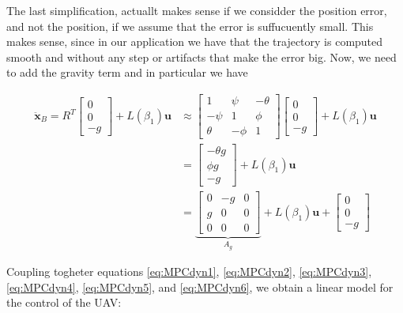\noindent The last simplification, actuallt makes sense if we considder the position error, and not the position, if we assume that the error is suffucuently small. This makes sense, since in our application we have that the trajectory is computed smooth and without any step or artifacts that make the error big. Now, we need to add the gravity term and in particular we have

\begin{align}
	\ddot{\mathbf{x}}_B = R^T
	\begin{bmatrix}
		0 \\
		0 \\
		-g
	\end{bmatrix}
	+L(\beta_1)\mathbf{u} &\approx
	\begin{bmatrix}
		1 & \psi  & -\theta \\
		-\psi & 1 & \phi \\
		\theta & -\phi & 1  
	\end{bmatrix}
	\begin{bmatrix}
		0 \\
		0 \\
		-g
	\end{bmatrix}	
	+L(\beta_1)\mathbf{u} \nonumber \\
	&=
	\begin{bmatrix}
		-\theta g \\
		\phi g \\
		-g 
	\end{bmatrix}
	+L(\beta_1)\mathbf{u} \nonumber \\
	&=\underbrace{ 
	\begin{bmatrix}
		0 & -g & 0 \\
		g & 0  & 0 \\
		0 & 0  & 0
	\end{bmatrix}}_{A_g} + L(\beta_1)\mathbf{u}+
	\begin{bmatrix}
		0 \\
		0 \\
		-g
	\end{bmatrix}
	\label{eq:MPCdyn6}	
\end{align}

\noindent Coupling togheter equations \eqref{eq:MPCdyn1}, \eqref{eq:MPCdyn2}, \eqref{eq:MPCdyn3}, \eqref{eq:MPCdyn4}, \eqref{eq:MPCdyn5}, and \eqref{eq:MPCdyn6}, we obtain a linear model for the control of the UAV:

